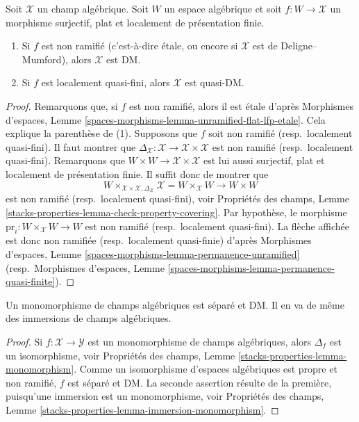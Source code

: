 \begin{lemma}
\label{lemma-properties-covering-imply-diagonal}
Soit $\mathcal{X}$ un champ algébrique.
Soit $W$ un espace algébrique et soit $f : W \to \mathcal{X}$
un morphisme surjectif, plat et localement de présentation finie.
\begin{enumerate}
\item Si $f$ est non ramifié (c'est-à-dire étale, ou encore si
$\mathcal{X}$ est de Deligne--Mumford), alors $\mathcal{X}$ est DM.
\item Si $f$ est localement quasi-fini, alors $\mathcal{X}$ est quasi-DM.
\end{enumerate}
\end{lemma}

\begin{proof}
Remarquons que, si $f$ est non ramifié, alors il est étale d'après
Morphismes d'espaces, Lemme
\ref{spaces-morphisms-lemma-unramified-flat-lfp-etale}.
Cela explique la parenthèse de (1).
Supposons que $f$ soit non ramifié (resp.\ localement quasi-fini). Il faut
montrer que
$\Delta_\mathcal{X} : \mathcal{X} \to \mathcal{X} \times \mathcal{X}$
est non ramifié (resp.\ localement quasi-fini). Remarquons que
$W \times W \to \mathcal{X} \times \mathcal{X}$ est lui aussi surjectif,
plat et localement de présentation finie. Il suffit donc de montrer que
$$
W \times_{\mathcal{X} \times \mathcal{X}, \Delta_\mathcal{X}} \mathcal{X}
=
W \times_\mathcal{X} W
\longrightarrow
W \times W
$$
est non ramifié (resp.\ localement quasi-fini), voir Propriétés des champs,
Lemme
\ref{stacks-properties-lemma-check-property-covering}.
Par hypothèse, le morphisme $\text{pr}_i : W \times_\mathcal{X} W \to W$
est non ramifié (resp.\ localement quasi-fini). La flèche affichée est donc
non ramifiée (resp.\ localement quasi-finie) d'après Morphismes d'espaces,
Lemme
\ref{spaces-morphisms-lemma-permanence-unramified}
(resp.\ Morphismes d'espaces, Lemme
\ref{spaces-morphisms-lemma-permanence-quasi-finite}).
\end{proof}

\begin{lemma}
\label{lemma-monomorphism-separated}
Un monomorphisme de champs algébriques est séparé et DM.
Il en va de même des immersions de champs algébriques.
\end{lemma}

\begin{proof}
Si $f : \mathcal{X} \to \mathcal{Y}$ est un monomorphisme de champs
algébriques, alors $\Delta_f$ est un isomorphisme, voir Propriétés des
champs, Lemme \ref{stacks-properties-lemma-monomorphism}.
Comme un isomorphisme d'espaces algébriques est propre et non ramifié,
$f$ est séparé et DM. La seconde assertion résulte de la première, puisqu'une
immersion est un monomorphisme, voir Propriétés des champs, Lemme
\ref{stacks-properties-lemma-immersion-monomorphism}.
\end{proof}

